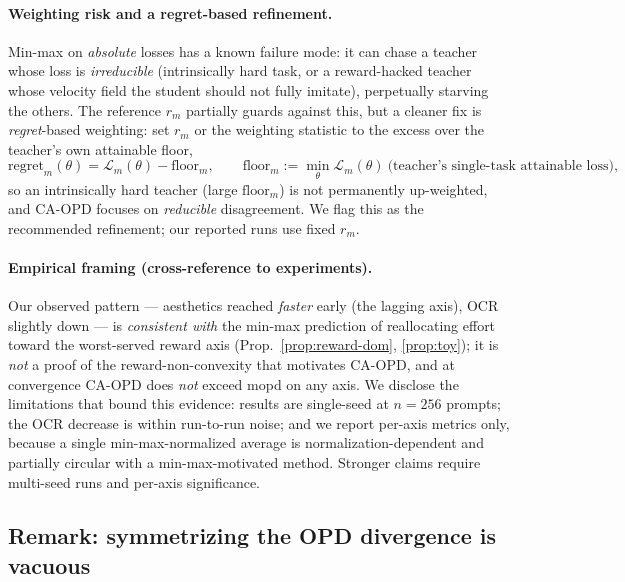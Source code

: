 \paragraph{Weighting risk and a regret-based refinement.}
Min-max on \emph{absolute} losses has a known failure mode: it can chase a teacher whose
loss is \emph{irreducible} (intrinsically hard task, or a reward-hacked teacher whose
velocity field the student should not fully imitate), perpetually starving the others.
The reference $r_m$ partially guards against this, but a cleaner fix is \emph{regret}-based
weighting: set $r_m$ or the weighting statistic to the excess over the teacher's own
attainable floor,
\begin{equation}
\label{eq:th-regret}
\text{regret}_m(\theta)=\mathcal L_m(\theta)-\mathrm{floor}_m,\qquad
\mathrm{floor}_m := \min_\theta \mathcal L_m(\theta)\ \text{(teacher's single-task attainable loss)},
\end{equation}
so an intrinsically hard teacher (large $\mathrm{floor}_m$) is not permanently
up-weighted, and CA-OPD focuses on \emph{reducible} disagreement. We flag this as the
recommended refinement; our reported runs use fixed $r_m$.

\paragraph{Empirical framing (cross-reference to experiments).}
Our observed pattern --- aesthetics reached \emph{faster} early (the lagging axis),
OCR slightly down --- is \emph{consistent with} the min-max prediction of
reallocating effort toward the worst-served reward axis (Prop.~\ref{prop:reward-dom},
\ref{prop:toy}); it is \emph{not} a proof of the reward-non-convexity that motivates
CA-OPD, and at convergence CA-OPD does \emph{not} exceed mopd on any axis. We disclose
the limitations that bound this evidence: results are single-seed at $n{=}256$ prompts;
the OCR decrease is within run-to-run noise; and we report per-axis metrics only,
because a single min-max-normalized average is normalization-dependent and partially
circular with a min-max-motivated method. Stronger claims require multi-seed runs and
per-axis significance.

\subsection{Remark: symmetrizing the OPD divergence is vacuous}
\label{sec:th-symmetry}

